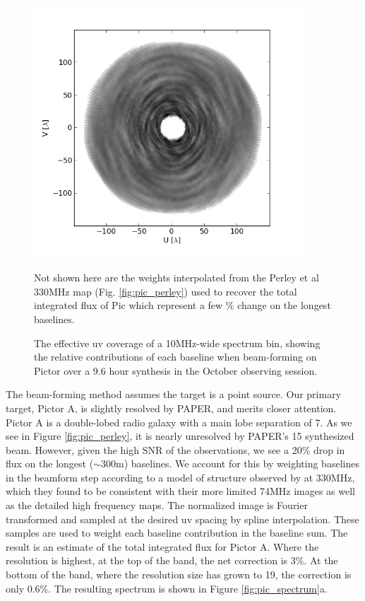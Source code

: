 \documentclass[preprint]{aastex}
\begin{document}
\begin{figure}
\includegraphics[width=0.9\textwidth]{plots/PicA_Oct2011_uv_coverage.png}
\caption{The effective uv coverage of a 10MHz-wide spectrum bin, showing the relative contributions of each baseline when beam-forming on Pictor over a 9.6 hour synthesis in the October observing session. \label{fig:uv_coverage}}
Not shown here are the weights interpolated from the Perley et al 330MHz map (Fig. \ref{fig:pic_perley}) used to recover the total integrated flux of Pic  which represent a few \% change on the longest baselines.
\end{figure}

The beam-forming method assumes the target is a point source. Our primary
target, Pictor A, is slightly resolved by PAPER, and merits closer attention.
Pictor A is a double-lobed radio galaxy with a main lobe separation of
7\arcmin{}. As we see in Figure \ref{fig:pic_perley}, it is nearly unresolved by
PAPER's 15\arcmin{}  synthesized beam. However, given the high SNR of the
observations, we see a 20\% drop in flux on the longest ($\sim$300m) baselines. 
We account for this by weighting baselines
in the beamform step according to a model of structure observed by
\citet{Perley:1997p9312} at 330MHz, which they found to be consistent with
their more limited 74MHz images as well as the detailed high frequency maps.
The normalized image is Fourier transformed and sampled at the desired uv
spacing by spline interpolation. These samples are used to weight each baseline
contribution in the baseline sum. The result is an estimate of the total
integrated flux for Pictor A. Where the resolution is highest, at the top of
the band, the net correction is 3\%. At the bottom of the band, where the
resolution size has grown to 19\arcmin{}, the correction is only 0.6\%. The
resulting spectrum is shown in Figure \ref{fig:pic_spectrum}a.
\end{document}
